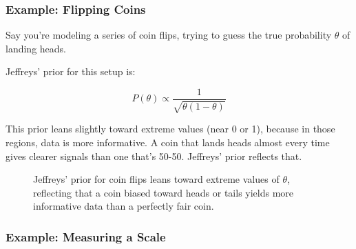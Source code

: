 \subsubsection{Example: Flipping Coins}

Say you’re modeling a series of coin flips, trying to guess the true probability \( \theta \) of landing heads.

Jeffreys' prior for this setup is:

\[
P(\theta) \propto \frac{1}{\sqrt{\theta(1 - \theta)}}
\]

This prior leans slightly toward extreme values (near 0 or 1), because in those regions, data is more informative. A coin that lands heads almost every time gives clearer signals than one that’s 50-50. Jeffreys' prior reflects that.


\begin{figure}[H]
\centering
{}
\caption{Jeffreys' prior for coin flips leans toward extreme values of \( \theta \), reflecting that a coin biased toward heads or tails yields more informative data than a perfectly fair coin.}
\end{figure}






\subsubsection{Example: Measuring a Scale}

